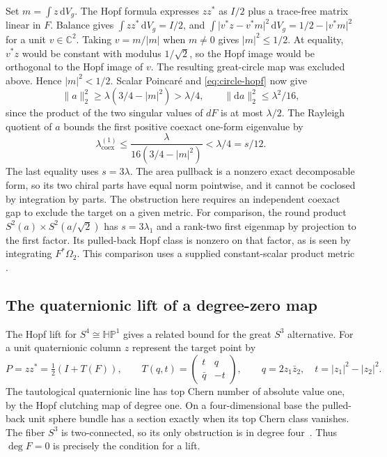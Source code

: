 \documentclass[11pt]{article}
\numberwithin{equation}{section}
\newcommand{\dd}{\mathrm{d}}
\newcommand{\abs}[1]{\lvert #1\rvert}
\newcommand{\norm}[1]{\lVert #1\rVert}
\newcommand{\dv}{\dd V_g}
\begin{document}
Set \(m=\int z\,\dv\). The Hopf formula expresses \(zz^*\)
as \(I/2\) plus a trace-free matrix linear in \(F\). Balance gives
\(\int zz^*\,\dv=I/2\), and
\(\int\abs{v^*z-v^*m}^2\,\dv=1/2-\abs{v^*m}^2\) for a unit
\(v\in\mathbb C^2\). Taking \(v=m/\abs m\) when \(m\ne0\) gives
\(\abs m^2\le1/2\). At equality, \(v^*z\) would be constant with
modulus \(1/\sqrt2\), so the Hopf image would be orthogonal to
the Hopf image of \(v\). The resulting great-circle map was
excluded above. Hence \(\abs m^2<1/2\).
Scalar Poincar\'e and \eqref{eq:circle-hopf} now give
\[
 \norm a_2^2\ge\lambda(3/4-\abs m^2)>\lambda/4,\qquad
 \norm{\dd a}_2^2
 \le \lambda^2/16 ,
\]
since the product of the two singular values of \(dF\) is at
most \(\lambda/2\). The Rayleigh quotient of \(a\) bounds the
first positive coexact one-form eigenvalue by
\[
 \lambda_{\mathrm{coex}}^{(1)}
 \le \frac{\lambda}{16(3/4-\abs m^2)}
 <\lambda/4=s/12 .
\]
The last equality uses \(s=3\lambda\). The area pullback is a
nonzero exact decomposable form, so its two chiral parts have
equal norm pointwise, and it cannot be coclosed by integration
by parts. The obstruction here requires an independent coexact
gap to exclude the target on a given metric. For comparison, the
round product \(S^2(a)\times S^2(a/\sqrt2)\) has \(s=3\lambda_1\)
and a rank-two first eigenmap by projection to the first factor.
Its pulled-back Hopf class is nonzero on that factor, as is
seen by integrating \(F^*\Omega_2\). This comparison uses
a supplied constant-scalar product metric
\cite[\S4.2]{DeLimaPiccioneZedda2012Yamabe}.

\subsection{The quaternionic lift of a degree-zero map}

The Hopf lift for \(S^4\cong\mathbb{HP}^1\) gives a related
bound for the great \(S^3\) alternative. For a unit quaternionic
column \(z\) represent the target point by
\[
 P=zz^*=\tfrac12(I+T(F)),\qquad
 T(q,t)=
 \begin{pmatrix}t&q\\\bar q&-t\end{pmatrix},\qquad
 q=2z_1\bar z_2,\quad t=\abs{z_1}^2-\abs{z_2}^2 .
\]
The tautological quaternionic line has top Chern number of
absolute value one, by the Hopf clutching map of degree one.
On a four-dimensional base the pulled-back unit sphere bundle
has a section exactly when its top Chern class vanishes. The
fiber \(S^3\) is two-connected, so its only obstruction is in
degree four~\cite[\S3]{Hatcher2017VectorBundles}. Thus
\(\deg F=0\) is precisely the condition for a lift.
\end{document}

